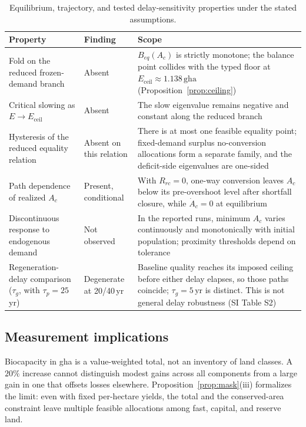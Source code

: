 \documentclass[preprint,12pt,authoryear]{elsarticle}
\newcommand{\Eceil}{E_{\mathrm{ceil}}}
\begin{document}
\begin{table}[!htbp]
\centering\footnotesize
\caption{Equilibrium, trajectory, and tested delay-sensitivity properties under the stated assumptions.}
\label{tab:neg}
\begin{tabularx}{\textwidth}{>{\raggedright\arraybackslash}p{} l >{\raggedright\arraybackslash}X}
\toprule
Property & Finding & Scope \\
\midrule
Fold on the reduced frozen-demand branch & Absent & $B_{eq}(A_c)$ is strictly monotone; the balance point collides with the typed floor at $\Eceil\approx1.138\,\mathrm{gha}$ (Proposition~\ref{prop:ceiling}) \\
Critical slowing as $E\to\Eceil$ & Absent & The slow eigenvalue remains negative and constant along the reduced branch \\
Hysteresis of the reduced equality relation & Absent on this relation & There is at most one feasible equality point; fixed-demand surplus no-conversion allocations form a separate family, and the deficit-side eigenvalues are one-sided \\
Path dependence of realized $A_c$ & Present, conditional & With $R_{rc}=0$, one-way conversion leaves $A_c$ below its pre-overshoot level after shortfall closure, while $\dot A_c=0$ at equilibrium \\
Discontinuous response to endogenous demand & Not observed & In the reported runs, minimum $A_c$ varies continuously and monotonically with initial population; proximity thresholds depend on tolerance \\
Regeneration-delay comparison ($\tau_g$, with $\tau_p=25$\,yr) & Degenerate at 20/40\,yr & Baseline quality reaches its imposed ceiling before either delay elapses, so those paths coincide; $\tau_g=5$\,yr is distinct. This is not general delay robustness (SI Table S2) \\
\bottomrule
\end{tabularx}
\end{table}
\clearpage

\subsection{Measurement implications}

Biocapacity in gha is a value-weighted total, not an inventory of land classes. A $20\%$ increase cannot distinguish modest gains across all components from a large gain in one that offsets losses elsewhere. Proposition~\ref{prop:mask}(iii) formalizes the limit: even with fixed per-hectare yields, the total and the conserved-area constraint leave multiple feasible allocations among fast, capital, and reserve land.
\end{document}
